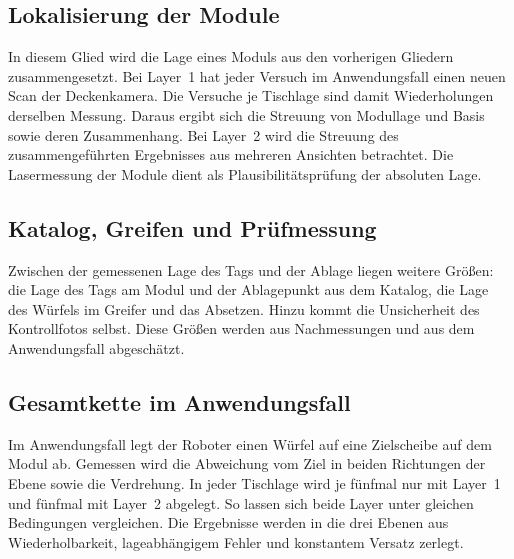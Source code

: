 
\subsection{Lokalisierung der Module}
\label{subsec:Lokalisierung_Genauigkeit}

In diesem Glied wird die Lage eines Moduls aus den vorherigen Gliedern zusammengesetzt. Bei Layer~1 hat jeder Versuch im Anwendungsfall einen neuen Scan der Deckenkamera. Die Versuche je Tischlage sind damit Wiederholungen derselben Messung. Daraus ergibt sich die Streuung von Modullage und Basis sowie deren Zusammenhang. Bei Layer~2 wird die Streuung des zusammengeführten Ergebnisses aus mehreren Ansichten betrachtet. Die Lasermessung der Module dient als Plausibilitätsprüfung der absoluten Lage.


\subsection{Katalog, Greifen und Prüfmessung}
\label{subsec:Katalog_Greifen}

Zwischen der gemessenen Lage des Tags und der Ablage liegen weitere Größen: die Lage des Tags am Modul und der Ablagepunkt aus dem Katalog, die Lage des Würfels im Greifer und das Absetzen. Hinzu kommt die Unsicherheit des Kontrollfotos selbst. Diese Größen werden aus Nachmessungen und aus dem Anwendungsfall abgeschätzt.


\subsection{Gesamtkette im Anwendungsfall}
\label{subsec:Gesamtkette}

Im Anwendungsfall legt der Roboter einen Würfel auf eine Zielscheibe auf dem Modul ab. Gemessen wird die Abweichung vom Ziel in beiden Richtungen der Ebene sowie die Verdrehung. In jeder Tischlage wird je fünfmal nur mit Layer~1 und fünfmal mit Layer~2 abgelegt. So lassen sich beide Layer unter gleichen Bedingungen vergleichen. Die Ergebnisse werden in die drei Ebenen aus Wiederholbarkeit, lageabhängigem Fehler und konstantem Versatz zerlegt.

